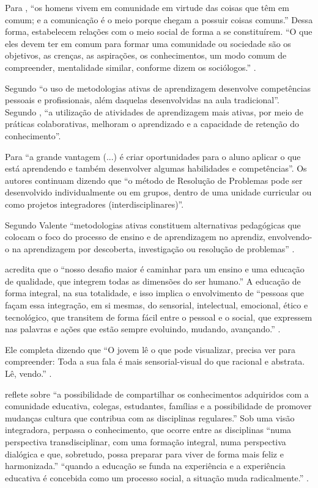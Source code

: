 Para , ``os homens vivem em comunidade em virtude das coisas que têm em comum; e a comunicação é o meio porque chegam a possuir coisas comuns.'' Dessa forma, estabelecem relações com o meio social de forma a se constituírem. ``O que eles devem ter em comum para formar uma comunidade ou sociedade são os objetivos, as crenças, as aspirações, os conhecimentos, um modo comum de compreender, mentalidade similar, conforme dizem os sociólogos.'' \cite[p. 17]{DEWEY1979}.

Segundo  ``o uso de metodologias ativas de aprendizagem desenvolve competências pessoais e profissionais, além daquelas desenvolvidas na aula tradicional''. Segundo  , ``a utilização de atividades de aprendizagem mais ativas, por meio de práticas colaborativas, melhoram o aprendizado e a capacidade de retenção do conhecimento''.

Para  ``a grande vantagem (...) é criar oportunidades para o aluno aplicar o que está aprendendo e também desenvolver algumas habilidades e competências''. Os autores continuam dizendo que ``o método de Resolução de Problemas pode ser desenvolvido individualmente ou em grupos, dentro de uma unidade curricular ou como projetos integradores (interdisciplinares)''.

Segundo Valente ``metodologias ativas constituem alternativas pedagógicas que colocam o foco do processo de ensino e de aprendizagem no aprendiz, envolvendo-o na aprendizagem por descoberta, investigação ou resolução de problemas'' \cite[p. 27]{VALENTE2018}.

 acredita que o ``nosso desafio maior é caminhar para um ensino e uma educação de qualidade, que integrem todas as dimensões do ser humano.'' A educação de forma integral, na sua totalidade, e isso implica o envolvimento de ``pessoas que façam essa integração, em si mesmas, do sensorial, intelectual, emocional, ético e tecnológico, que transitem de forma fácil entre o pessoal e o social, que expressem nas palavras e ações que estão sempre evoluindo, mudando, avançando.'' \cite[p. 29]{MORAN2012}.

Ele completa dizendo que ``O jovem lê o que pode visualizar, precisa ver para compreender: Toda a sua fala é mais sensorial-visual do que racional e abstrata. Lê, vendo.'' \cite[p. 29]{MORAN1995}.

 reflete sobre ``a possibilidade de compartilhar os conhecimentos adquiridos com a comunidade educativa, colegas, estudantes, famílias e a possibilidade de promover mudanças cultura que contribua com as disciplinas regulares.'' Sob uma visão integradora, perpassa o conhecimento, que ocorre entre as disciplinas ``numa perspectiva transdisciplinar, com uma formação integral, numa perspectiva dialógica e que, sobretudo, possa preparar para viver de forma mais feliz e harmonizada.'' ``quando a educação se funda na experiência e a experiência educativa é concebida como um processo social, a situação muda radicalmente.'' \cite[p. 55]{DEWEY1979}.

